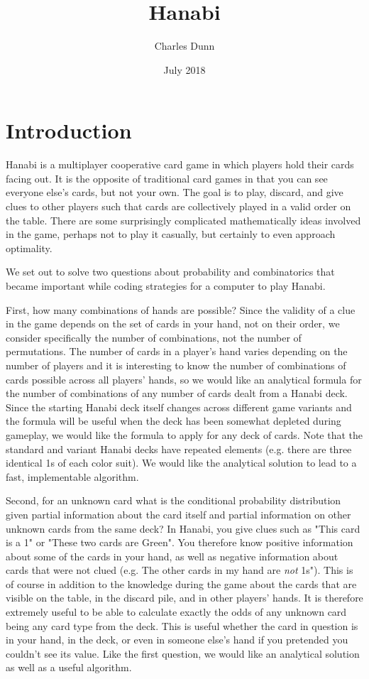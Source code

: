 \documentclass{article}
\title{Hanabi}
\author{Charles Dunn}
\date{July 2018}
\begin{document}
\maketitle

\section{Introduction}

Hanabi is a multiplayer cooperative card game in which players hold their cards facing out. It is the opposite of traditional card games in that you can see everyone else's cards, but not your own. The goal is to play, discard, and give clues to other players such that cards are collectively played in a valid order on the table. There are some surprisingly complicated mathematically ideas involved in the game, perhaps not to play it casually, but certainly to even approach optimality.

We set out to solve two questions about probability and combinatorics that became important while coding strategies for a computer to play Hanabi. 

First, how many combinations of hands are possible? Since the validity of a clue in the game depends on the set of cards in your hand, not on their order, we consider specifically the number of combinations, not the number of permutations. The number of cards in a player's hand varies depending on the number of players and it is interesting to know the number of combinations of cards possible across all players' hands, so we would like an analytical formula for the number of combinations of any number of cards dealt from a Hanabi deck. Since the starting Hanabi deck itself changes across different game variants and the formula will be useful when the deck has been somewhat depleted during gameplay, we would like the formula to apply for any deck of cards. Note that the standard and variant Hanabi decks have repeated elements (e.g. there are three identical 1s of each color suit). We would like the analytical solution to lead to a fast, implementable algorithm.

Second, for an unknown card what is the conditional probability distribution given partial information about the card itself and partial information on other unknown cards from the same deck? In Hanabi, you give clues such as "This card is a 1" or "These two cards are Green". You therefore know positive information about some of the cards in your hand, as well as negative information about cards that were not clued (e.g. The other cards in my hand are \emph{not} 1s"). This is of course in addition to the knowledge during the game about the cards that are visible on the table, in the discard pile, and in other players' hands. It is therefore extremely useful to be able to calculate exactly the odds of any unknown card being any card type from the deck. This is useful whether the card in question is in your hand, in the deck, or even in someone else's hand if you pretended you couldn't see its value. Like the first question, we would like an analytical solution as well as a useful algorithm.
\end{document}
